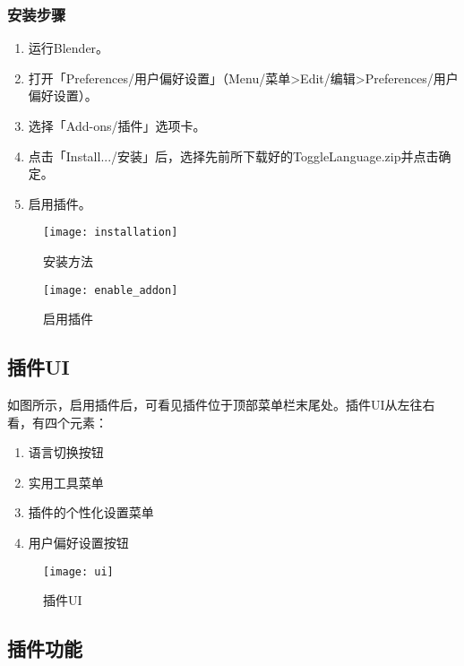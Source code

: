 \documentclass{../../public_resources/doc}
\begin{document}
\subsubsection{安装步骤}
\begin{enumerate}
    \item 运行Blender。
    \item 打开「Preferences/用户偏好设置」（Menu/菜单>Edit/编辑>Preferences/用户偏好设置）。
    \item 选择「Add-ons/插件」选项卡。
    \item 点击「Install.../安装」后，选择先前所下载好的ToggleLanguage.zip并点击确定。
    \item 启用插件。
\end{enumerate}

\begin{figure}[h!]
    \begin{minipage}[t]{0.48\linewidth}
        \texttt{[image: installation]}
        \caption{安装方法}
    \end{minipage}
    \quad
    \begin{minipage}[t]{0.48\linewidth}
        \texttt{[image: enable\_addon]}
        \caption{启用插件}
        \label{启用插件}
    \end{minipage}
\end{figure}

\subsection{插件UI}
\label{插件UI小节}
如图所示，启用插件后，可看见插件位于顶部菜单栏末尾处。插件UI从左往右看，有四个元素：
\begin{enumerate}
    \item 语言切换按钮
    \item 实用工具菜单
    \item 插件的个性化设置菜单
    \item 用户偏好设置按钮
\end{enumerate}

\begin{figure}[h!]
    \texttt{[image: ui]}
    \caption{插件UI}
    \label{插件UI}
\end{figure}

\subsection{插件功能}
\hypertarget{AddonFeatures}{}
\end{document}
